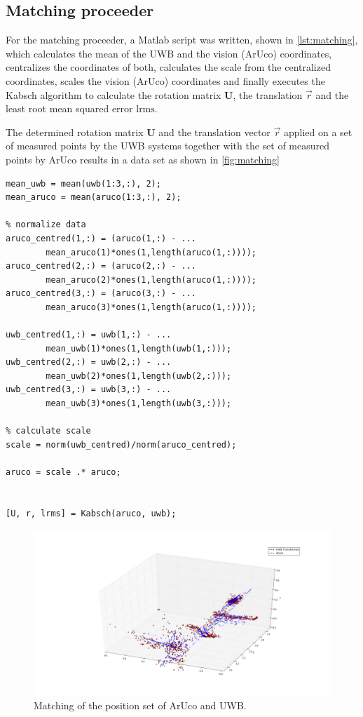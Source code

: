 \subsection{Matching proceeder}\label{subsec:matching}
For the matching proceeder, a Matlab script was written, shown in \autoref{lst:matching}, which calculates the mean of the UWB and the vision (ArUco) coordinates, centralizes the coordinates of both, calculates the scale from the centralized coordinates, scales the vision (ArUco) coordinates and finally executes the Kabsch algorithm to calculate the rotation matrix $\textbf{U}$, the translation $\vec r$ and the least root mean squared error $\text{lrms}$.

The determined rotation matrix $\textbf{U}$ and the translation vector $\vec r$ applied on a set of measured points by the UWB systems together with the set of measured points by ArUco results in a data set as shown in \autoref{fig:matching}

\lstset{language=Matlab}
\begin{lstlisting}[frame=single, caption=Matching proceeder, label=lst:matching]
% Calculate mean
mean_uwb = mean(uwb(1:3,:), 2);
mean_aruco = mean(aruco(1:3,:), 2);
	
% normalize data	
aruco_centred(1,:) = (aruco(1,:) - ...
		mean_aruco(1)*ones(1,length(aruco(1,:))));
aruco_centred(2,:) = (aruco(2,:) - ...
		mean_aruco(2)*ones(1,length(aruco(1,:))));
aruco_centred(3,:) = (aruco(3,:) - ...
		mean_aruco(3)*ones(1,length(aruco(1,:))));

uwb_centred(1,:) = uwb(1,:) - ...
		mean_uwb(1)*ones(1,length(uwb(1,:)));
uwb_centred(2,:) = uwb(2,:) - ...
		mean_uwb(2)*ones(1,length(uwb(2,:)));
uwb_centred(3,:) = uwb(3,:) - ...
		mean_uwb(3)*ones(1,length(uwb(3,:)));
	
% calculate scale
scale = norm(uwb_centred)/norm(aruco_centred);
	
aruco = scale .* aruco;
	
	
[U, r, lrms] = Kabsch(aruco, uwb);
\end{lstlisting}

\begin{figure}[ht!]\centering
	\includegraphics[width=1.0\textwidth]{figures/matching}
	\caption{Matching of the position set of ArUco and UWB.}\label{fig:matching}
\end{figure} 


